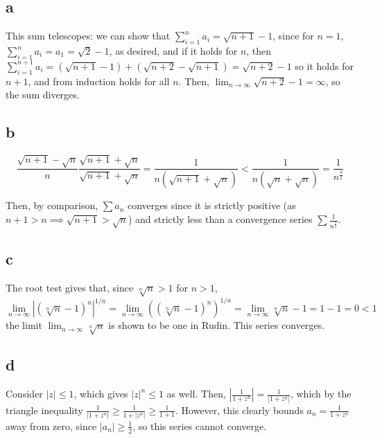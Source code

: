 \documentclass[12pt,letterpaper]{article}
\theoremstyle{definition}
\begin{document}
\subsection*{a}

This sum telescopes: we can show that $\sum_{i=1}^{n}a_{i} = \sqrt{n+1} - 1$, since for $n = 1$, $\sum_{i=1}^{n}a_{i} = a_{1} = \sqrt{2} - 1$, as desired, and if it holds for $n$, then $\sum_{i=1}^{n+1}a_{i} = (\sqrt{n+1} - 1) + (\sqrt{n+2} - \sqrt{n+1}) = \sqrt{n+2} - 1$ so it holds for $n + 1$, and from induction holds for all $n$. Then, $\lim_{n \rightarrow \infty}\sqrt{n  +2} - 1 = \infty$, so the sum diverges.

\subsection*{b}

\[
  \frac{\sqrt{n+1} - \sqrt{n}}{n}\frac{\sqrt{n+1} + \sqrt{n}}{\sqrt{n+1} + \sqrt{n}} = \frac{1}{n(\sqrt{n + 1} + \sqrt{n})} < \frac{1}{n(\sqrt{n} + \sqrt{n})} = \frac{1}{n^{\frac{3}{2}}}
\]

Then, by comparison, $\sum a_{n}$ converges since it is strictly positive (as $n + 1 > n \implies \sqrt{n + 1} > \sqrt{n}$) and strictly less than a convergence series $\sum \frac{1}{n^{\frac{3}{2}}}$.

\subsection*{c}

The root test gives that, since $\sqrt[n]{n} > 1$ for $n > 1$,
\[
  \lim_{n \rightarrow\infty}|(\sqrt[n]{n} - 1)^{n}|^{1/n} = \lim_{n \rightarrow\infty}((\sqrt[n]{n} - 1)^{n})^{1/n} = \lim_{n \rightarrow\infty}\sqrt[n]{n} - 1 = 1 - 1 = 0 < 1
\]
the limit $\lim_{n \rightarrow \infty}\sqrt[n]{n}$ is shown to be one in Rudin. This series converges.

\subsection*{d}

Consider $|z| \leq 1$, which gives $|z|^{n} \leq 1$ as well. Then, $\left|\frac{1}{1 + z^{n}}\right| = \frac{1}{|1 + z^{n}|}$, which by the triangle inequality $\frac{1}{|1 + z^{n}|} \geq \frac{1}{1 + |z^{n}|} \geq \frac{1}{1 + 1}$. However, this clearly bounds $a_{n} = \frac{1}{1 + z^{n}}$ away from zero, since $|a_{n}| \geq \frac{1}{2}$, so this series cannot converge.
\end{document}
